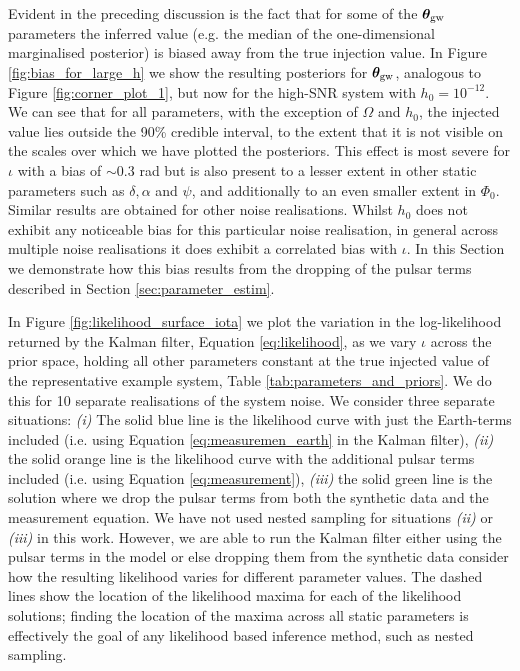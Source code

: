 \documentclass[fleqn,usenatbib,useAMS]{mnras}
\begin{document}
Evident in the preceding discussion is the fact that for some of the $\boldsymbol{\theta}_{\rm gw}$ parameters the inferred value (e.g. the median of the one-dimensional marginalised posterior) is biased away from the true injection value. In Figure \ref{fig:bias_for_large_h} we show the resulting posteriors for $\boldsymbol{\theta}_{\rm gw}$, analogous to Figure \ref{fig:corner_plot_1}, but now for the high-SNR system with $h_0 = 10^{-12}$. We can see that for all parameters, with the exception of $\Omega$ and $h_0$, the injected value lies outside the 90\% credible interval, to the extent that it is not visible on the scales over which we have plotted the posteriors. This effect is most severe for $\iota$ with a bias of $\sim 0.3$ rad but is also present to a lesser extent in other static parameters such as $\delta,\alpha$ and $\psi$, and additionally to an even smaller extent in $\Phi_0$. Similar results are obtained for other noise realisations. Whilst $h_0$ does not exhibit any noticeable bias for this particular noise realisation, in general across multiple noise realisations it does exhibit a correlated bias with $\iota$. In this Section we demonstrate how this bias results from the dropping of the pulsar terms described in Section \ref{sec:parameter_estim}. \newline 


In Figure \ref{fig:likelihood_surface_iota} we plot the variation in the log-likelihood returned by the Kalman filter, Equation \eqref{eq:likelihood}, as we vary $\iota$ across the prior space, holding all other parameters constant at the true injected value of the representative example system, Table \ref{tab:parameters_and_priors}. We do this for 10 separate realisations of the system noise. We consider three separate situations: \textit{(i)} The solid blue line is the likelihood curve with just the Earth-terms included (i.e. using Equation \ref{eq:measuremen_earth} in the Kalman filter), \textit{(ii)} the solid orange line is the likelihood curve with the additional pulsar terms included (i.e. using Equation \ref{eq:measurement}), \textit{(iii)} the solid green line is the solution where we drop the pulsar terms from both the synthetic data and the measurement equation. We have not used nested sampling for situations \textit{(ii)} or \textit{(iii)} in this work. However, we are able to run the Kalman filter either using the pulsar terms in the model or else dropping them from the synthetic data consider how the resulting likelihood varies for different parameter values. The dashed lines show the location of the likelihood maxima for each of the likelihood solutions; finding the location of the maxima across all static parameters is effectively the goal of any likelihood based inference method, such as nested sampling. \newline  
\end{document}
